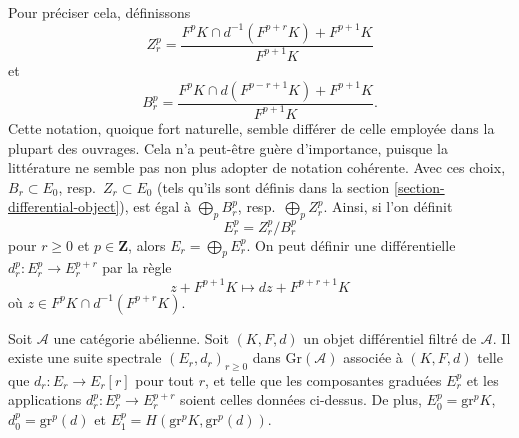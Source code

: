 \medskip\noindent
Pour préciser cela, définissons
$$
Z_r^p =
\frac{F^pK \cap d^{-1}(F^{p + r}K) + F^{p + 1}K}{F^{p + 1}K}
$$
et
$$
B_r^p =
\frac{F^pK \cap d(F^{p - r + 1}K) + F^{p + 1}K}{F^{p + 1}K}.
$$
Cette notation, quoique fort naturelle, semble différer de celle employée
dans la plupart des ouvrages. Cela n'a peut-être guère d'importance,
puisque la littérature ne semble pas non plus adopter de notation cohérente.
Avec ces choix, $B_r \subset E_0$,
resp.\ $Z_r \subset E_0$ (tels qu'ils sont définis dans la
section \ref{section-differential-object}), est égal à
$\bigoplus_p B_r^p$, resp.\ $\bigoplus_p Z_r^p$.
Ainsi, si l'on définit
$$
E_r^p = Z_r^p/B_r^p
$$
pour $r \geq 0$ et $p \in \mathbf{Z}$, alors $E_r = \bigoplus_p E_r^p$.
On peut définir une différentielle $d_r^p : E_r^p \to E_r^{p + r}$
par la règle
$$
z + F^{p + 1}K
\longmapsto
dz + F^{p + r + 1}K
$$
où $z \in F^pK \cap d^{-1}(F^{p + r}K)$.

\begin{lemma}
\label{lemma-spectral-sequence-filtered-differential}
Soit $\mathcal{A}$ une catégorie abélienne. Soit $(K, F, d)$ un
objet différentiel filtré de $\mathcal{A}$. Il existe une
suite spectrale $(E_r, d_r)_{r \geq 0}$ dans $\text{Gr}(\mathcal{A})$
associée à $(K, F, d)$ telle que $d_r : E_r \to E_r[r]$
pour tout $r$, et telle que les composantes graduées
$E_r^p$ et les applications $d_r^p : E_r^p \to E_r^{p + r}$
soient celles données ci-dessus. De plus, $E_0^p = \text{gr}^p K$,
$d_0^p = \text{gr}^p(d)$ et $E_1^p = H(\text{gr}^pK, \text{gr}^p(d))$.
\end{lemma}


